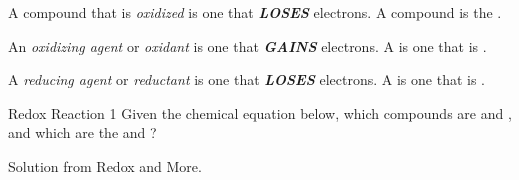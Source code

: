 \begin{definition}[Oxidized] \label{def:Oxidized}
  A compound that is \emph{oxidized} is one that \textbf{\emph{LOSES}} electrons.
  A  compound is the .
\end{definition}

\begin{definition} \label{def:Oxidizing Agent}
  An \emph{oxidizing agent} or \emph{oxidant} is one that \textbf{\emph{GAINS}} electrons.
  A  is one that is .
\end{definition}

\begin{definition} \label{def:Reducing Agent}
  A \emph{reducing agent} or \emph{reductant} is one that \textbf{\emph{LOSES}} electrons.
  A  is one that is .
\end{definition}

\begin{example}[]{Redox Reaction 1}
  Given the chemical equation below, which compounds are  and , and which are the  and ?
  
  
  \tcblower
  
  Solution from Redox and More.
\end{example}